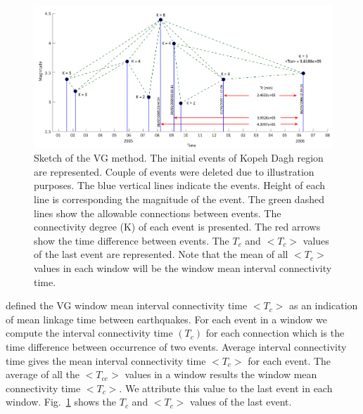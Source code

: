 \begin{figure} [ht]
\centering
\includegraphics[scale=0.24]{figures/pdf/Figure01.pdf} 
\caption{Sketch of the VG method. The initial events of Kopeh Dagh region are represented. Couple of events were deleted due to illustration purposes. The blue vertical lines indicate the events. Height of each line is corresponding the magnitude of the event. The green dashed lines show the allowable connections between events. The connectivity degree (K) of each event is presented. The red arrows show the time difference between events. The $T_c$ and $< T_c >$ values of the last event are represented. Note that the mean of all $<T_c>$ values in each window will be the window mean interval connectivity time.}
\label{fig:vg}
\end{figure}
\noindent
\citet{Telesca2014} defined the VG window mean interval connectivity time $<T_c>$ as an indication of mean linkage time between earthquakes. For each event in a window we compute the interval connectivity time $(T_c)$ for each connection which is the time difference between occurrence of two events. Average interval connectivity time gives the mean interval connectivity time $<T_c>$  for each event. The average of all the $<T_{ce}>$  values in a window results the window mean connectivity time $<T_c>$. We attribute this value to the last event in each window. Fig.~\ref{fig:vg} shows the  $T_c$ and $< T_c >$ values of the last event. 